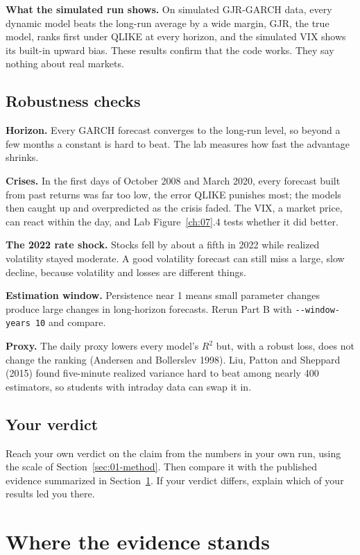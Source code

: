 \textbf{What the simulated run shows.} On simulated GJR-GARCH data, every dynamic model beats the long-run average by a wide margin, GJR, the true model, ranks first under QLIKE at every horizon, and the simulated VIX shows its built-in upward bias. These results confirm that the code works. They say nothing about real markets.

\subsection{Robustness checks}
\label{sec:10-stress}

\textbf{Horizon.} Every GARCH forecast converges to the long-run level, so beyond a few months a constant is hard to beat. The lab measures how fast the advantage shrinks.

\textbf{Crises.} In the first days of October 2008 and March 2020, every forecast built from past returns was far too low, the error QLIKE punishes most; the models then caught up and overpredicted as the crisis faded. The VIX, a market price, can react within the day, and Lab Figure~\ref{ch:07}.4 tests whether it did better.

\textbf{The 2022 rate shock.} Stocks fell by about a fifth in 2022 while realized volatility stayed moderate. A good volatility forecast can still miss a large, slow decline, because volatility and losses are different things.

\textbf{Estimation window.} Persistence near 1 means small parameter changes produce large changes in long-horizon forecasts. Rerun Part B with \texttt{-{}-window-years 10} and compare.

\textbf{Proxy.} The daily proxy lowers every model's $R^2$ but, with a robust loss, does not change the ranking (Andersen and Bollerslev 1998). Liu, Patton and Sheppard (2015) found five-minute realized variance hard to beat among nearly 400 estimators, so students with intraday data can swap it in.

\subsection*{Your verdict}

Reach your own verdict on the claim from the numbers in your own run, using the scale of Section~\ref{sec:01-method}. Then compare it with the published evidence summarized in Section~\ref{sec:10-verdict}. If your verdict differs, explain which of your results led you there.

\section{Where the evidence stands}
\label{sec:10-verdict}

